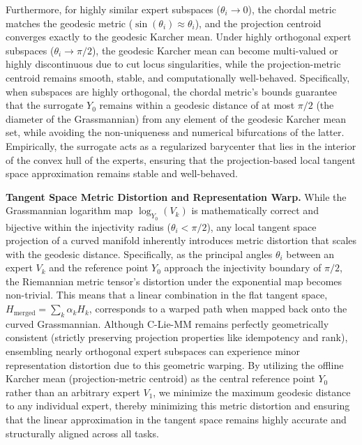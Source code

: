 Furthermore, for highly similar expert subspaces ($\theta_i \to 0$), the chordal metric matches the geodesic metric ($\sin(\theta_i) \approx \theta_i$), and the projection centroid converges exactly to the geodesic Karcher mean. Under highly orthogonal expert subspaces ($\theta_i \to \pi/2$), the geodesic Karcher mean can become multi-valued or highly discontinuous due to cut locus singularities, while the projection-metric centroid remains smooth, stable, and computationally well-behaved. Specifically, when subspaces are highly orthogonal, the chordal metric's bounds guarantee that the surrogate $Y_0$ remains within a geodesic distance of at most $\pi/2$ (the diameter of the Grassmannian) from any element of the geodesic Karcher mean set, while avoiding the non-uniqueness and numerical bifurcations of the latter. Empirically, the surrogate acts as a regularized barycenter that lies in the interior of the convex hull of the experts, ensuring that the projection-based local tangent space approximation remains stable and well-behaved.

\textbf{Tangent Space Metric Distortion and Representation Warp.} While the Grassmannian logarithm map $\log_{Y_0}(V_k)$ is mathematically correct and bijective within the injectivity radius ($\theta_i < \pi/2$), any local tangent space projection of a curved manifold inherently introduces metric distortion that scales with the geodesic distance. Specifically, as the principal angles $\theta_i$ between an expert $V_k$ and the reference point $Y_0$ approach the injectivity boundary of $\pi/2$, the Riemannian metric tensor's distortion under the exponential map becomes non-trivial. This means that a linear combination in the flat tangent space, $H_{\text{merged}} = \sum_k \alpha_k H_k$, corresponds to a warped path when mapped back onto the curved Grassmannian. Although C-Lie-MM remains perfectly geometrically consistent (strictly preserving projection properties like idempotency and rank), ensembling nearly orthogonal expert subspaces can experience minor representation distortion due to this geometric warping. By utilizing the offline Karcher mean (projection-metric centroid) as the central reference point $Y_0$ rather than an arbitrary expert $V_1$, we minimize the maximum geodesic distance to any individual expert, thereby minimizing this metric distortion and ensuring that the linear approximation in the tangent space remains highly accurate and structurally aligned across all tasks.


